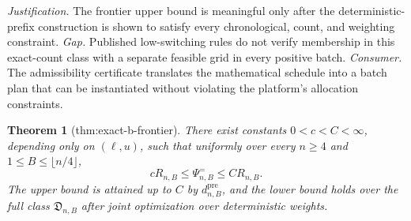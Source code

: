 \documentclass{article}
\newtheorem{theorem}{Theorem}
\begin{document}
\par\smallskip\noindent \textit{Justification.} The frontier upper bound is meaningful only after the deterministic-prefix construction is shown to satisfy every chronological, count, and weighting constraint. \textit{Gap.} Published low-switching rules do not verify membership in this exact-count class with a separate feasible grid in every positive batch. \textit{Consumer.} The admissibility certificate translates the mathematical schedule into a batch plan that can be instantiated without violating the platform's allocation constraints.

\begin{theorem}[thm:exact-b-frontier]\label{thm:exact-b-frontier}
There exist constants \(0<c<C<\infty\), depending only on \((\ell,u)\), such that uniformly over every \(n\ge4\) and \(1\le B\le\lfloor n/4\rfloor\), \[cR_{n,B}\le\Psi^{=}_{n,B}\le CR_{n,B}.\] The upper bound is attained up to \(C\) by \(d^{\mathrm{pre}}_{n,B}\), and the lower bound holds over the full class \(\mathfrak D_{n,B}\) after joint optimization over deterministic weights.
\end{theorem}
\end{document}
